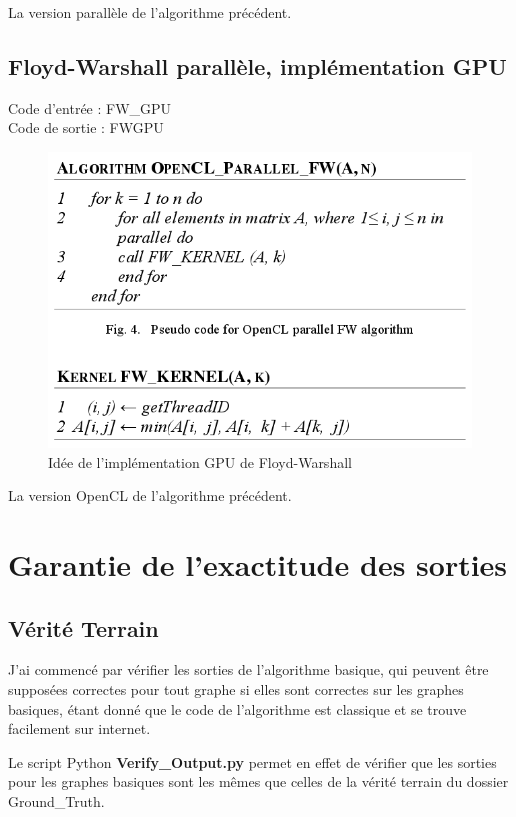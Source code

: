 \documentclass[a4paper,11pt]{article}
\begin{document}
La version parallèle de l'algorithme précédent.

\subsection{Floyd-Warshall parallèle, implémentation GPU}

\noindent Code d'entrée : FW\_GPU \\
Code de sortie : FWGPU

\begin{figure}[H]
\begin{center}
  \includegraphics[scale=0.5]{OpenCL_FW.png}
  \caption{Idée de l'implémentation GPU de Floyd-Warshall}
\end{center}
\end{figure}

La version OpenCL de l'algorithme précédent.

\section{Garantie de l'exactitude des sorties}
\subsection{Vérité Terrain}

J'ai commencé par vérifier les sorties de l'algorithme basique, qui peuvent être supposées correctes pour tout graphe si elles sont correctes sur les graphes basiques, étant donné que le code de l'algorithme est classique et se trouve facilement sur internet.

Le script Python \textbf{Verify\_Output.py} permet en effet de vérifier que les sorties pour les graphes basiques sont les mêmes que celles de la vérité terrain du dossier Ground\_Truth.
\end{document}
